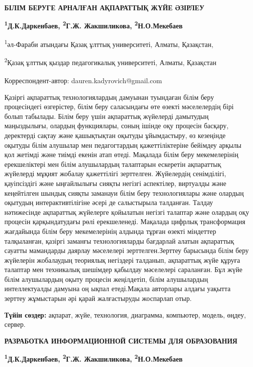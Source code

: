 
{\bfseries БІЛІМ БЕРУГЕ АРНАЛҒАН АҚПАРАТТЫҚ ЖҮЙЕ ӘЗІРЛЕУ}

{\bfseries \textsuperscript{1}Д.К.Даркенбаев\textsuperscript{\envelope },
\textsuperscript{2}Г.Ж. Жакшиликова, \textsuperscript{2}Н.О.Мекебаев}

\textsuperscript{1}әл-Фараби атындағы Қазақ ұлттық университеті, Алматы,
Қазақстан,

\textsuperscript{2}Қазақ ұлттық қыздар педагогикалық университеті,
Алматы, Қазақстан

\raggedright {\bfseries \textsuperscript{\envelope }}Корреспондент-автор: dauren.kadyrovich@gmail.com

Қазіргі ақпараттық технологиялардың дамуынан туындаған білім беру
процесіндегі өзгерістер, білім беру саласындағы өте өзекті мәселелердің
бірі болып табылады. Білім беру үшін ақпараттық жүйелерді дамытудың
маңыздылығы, олардың функциялары, соның ішінде оқу процесін басқару,
деректерді сақтау және қашықтықтан оқытуды ұйымдастыру, өз кезеңінде
оқытуды білім алушылар мен педагогтардың қажеттіліктеріне бейімдеу
арқылы қол жетімді және тиімді екенін атап өтеді. Мақалада білім беру
мекемелерінің ерекшеліктері мен білім алушылардың талаптарын ескеретін
ақпараттық жүйелерді мұқият жобалау қажеттілігі зерттелген. Жүйелердің
сенімділігі, қауіпсіздігі және ыңғайлылығы сияқты негізгі аспектілер,
виртуалды және кеңейтілген шындық сияқты заманауи білім беру
технологиялары және олардың оқытудың интерактивтілігіне әсері де
салыстырыла талданған. Талдау нәтижесінде ақпараттық жүйелерге қойылатын
негізгі талаптар және олардың оқу процесін қарқындатудағы рөлі
ерекшеленеді. Мақалада цифрлық трансформация жағдайында білім беру
мекемелерінің алдында тұрған өзекті міндеттер талқыланған, қазіргі
заманғы технологияларды бағдарлай алатын ақпараттық сауатты мамандарды
даярлау мәселелері зерттелген.Зерттеу барысында білім беру жүйелерін
жобалаудың теориялық негіздері талданып, ақпараттық жүйе құруға талаптар
мен техникалық шешімдер қабылдау мәселелері сараланған. Бұл жүйе білім
алушылардың оқыту процесін жеңілдетіп, білім алушылардың интеллектуалды
дамуына оң ықпал етеді.Мақала авторлары алдағы уақытта зерттеу
жұмыстарын әрі қарай жалғастыруды жоспарлап отыр.

{\bfseries Түйін сөздер:} ақпарат, жүйе, технология, диаграмма, компьютер,
модель, өңдеу, сервер.

{\bfseries РАЗРАБОТКА ИНФОРМАЦИОННОЙ СИСТЕМЫ ДЛЯ ОБРАЗОВАНИЯ}

{\bfseries \textsuperscript{1}Д.К.Даркенбаев\textsuperscript{\envelope },
\textsuperscript{2}Г.Ж. Жакшиликова, \textsuperscript{2}Н.О.Мекебаев}

